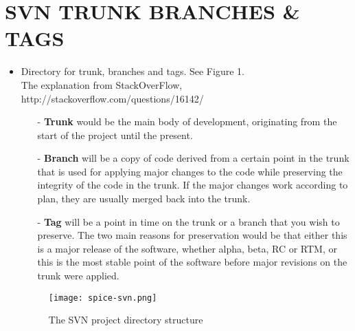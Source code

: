 \section{SVN TRUNK BRANCHES \& TAGS}
\begin{itemize}
\item
	Directory for trunk, branches and tags. See Figure 1. \\
	The explanation from StackOverFlow, http://stackoverflow.com/questions/16142/
	\begin{itemize}
	\item[-]
    \textbf{Trunk} would be the main body of development, originating from the start of the project until the present.
	\item[-]
    \textbf{Branch} will be a copy of code derived from a certain point in the trunk that is used for applying major changes to the code while preserving the integrity of the code in the trunk. If the major changes work according to plan, they are usually merged back into the trunk.
	\item[-]
    \textbf{Tag} will be a point in time on the trunk or a branch that you wish to preserve. The two main reasons for preservation would be that either this is a major release of the software, whether alpha, beta, RC or RTM, or this is the most stable point of the software before major revisions on the trunk were applied.
	\end{itemize}
	
\begin{figure}[h]
\label{fig:fig_svn}
\begin{center}
\texttt{[image: spice-svn.png]}
\caption{The SVN project directory structure}
\end{center}
\end{figure}	
	

\end{itemize}
